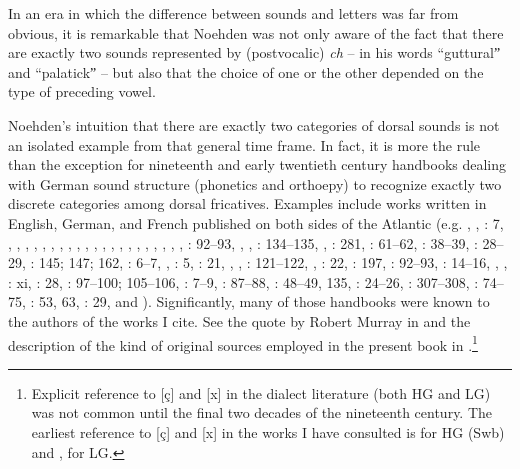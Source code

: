 In an era in which the difference between sounds and letters was far from obvious, it is remarkable that Noehden was not only aware of the fact that there are exactly two sounds represented by (postvocalic) \textit{ch} --  in his words “gutturalˮ and “palatickˮ -- but also that the choice of one or the other depended on the type of preceding vowel.

Noehden’s intuition that there are exactly two categories of dorsal sounds is not an isolated example from that general time frame. In fact, it is more the rule than the exception for nineteenth and early twentieth century handbooks dealing with German sound structure (phonetics and orthoepy) to recognize exactly two discrete categories among dorsal fricatives. Examples include works written in English, German, and French published on both sides of the Atlantic (e.g.
\citealt[7]{Render1804}, \citealt[166--167]{Bauer1827}, \citealt{Follen1828}: 7, \citealt[11]{Götzinger1830}, \citealt[7]{Bernays1833}, \citealt[199--200]{Götzinger1836}, \cites[69--70]{Rapp1836}[42--44]{Rapp1841}, \citealt[19]{Fosdick1838}, \citealt[28--29]{Gortzitza1841}, \citealt[2]{Wertheim1841}, \citealt[6, 48--50]{Schwabe1842}, \citealt[8]{Becker1845}, \citealt[3]{Adler1846}, \citealt[35]{Bauer1847}, \citealt[5]{Wendeborn1849},  \citealt[1]{Mannheimer1853}, \citealt[2]{Eichhorn1854}, \citealt[6]{Ahn1855}, \citealt[6]{Strauss1856}, \citealt[48]{Brücke1856}, \citealt[9--10]{Otto1864}, \citealt[12; 38--39]{Schmitt1868}, \citealt[16]{Humperdinck1868}, \citealt[23]{Worman1868}, \citealt{Rumpelt1869}: 92--93, \citealt[11]{Whitney1870}, \citealt[11]{Weisse1872}, \citealt{Sweet1877}: 134--135, \citealt[148--149]{Viëtor1884}, \citealt{Trautmann1884}: 281, \citealt{Sievers1885}: 61--62, \citealt{Hoffmann1888}: 38--39, \citealt{Schmolke1890}: 28--29, \citealt{Soames1891}: 145; 147; 162, \citealt{Grandgent1892}: 6--7, \citealt[76--77]{bremer1893}, \citealt{Wilmanns1893}: 5, \citealt{Valentine1894}: 21, \citealt[xxvi]{Siepmann1897}, \citealt[58--59]{Siebs1898}, \citealt{Hempl1898}: 121--122, \citealt[18]{Dannheisser1899}, \citealt{Viëtor1901}: 22, \citealt{Behaghel1902}: 197, \citealt{Trautmann1903}: 92--93,  \citealt{Johannson1906}: 14--16, \citealt[14, 16]{Viëtor1906}, \citealt[13]{Bacon1906}, \citealt{Schröer1907}: xi, \citealt{Sütterlin1907}: 28, \citealt{ScholleG.Smith1907}: 97--100; 105--106, \citealt{Grossmann1910}: 7--9, \citealt{Passy1912}: 87--88,  \citealt{Jespersen1913}: 48--49, 135, \citealt{Prokosch1916}: 24--26, \citealt{Paul1916}: 307--308, \citealt{Leky1917}: 74--75, \citealt{Richter1922}: 53, 63, \citealt{Curme1922}: 29, and \citealt[116--118]{Sütterlin1925}). Significantly, many of those handbooks were known to the authors of the works I cite. See the quote by Robert Murray in  and the description of the kind of original sources employed in the present book in .\footnote{Explicit reference to [ç] and [x] in the dialect literature (both HG and LG) was not common until the final two decades of the nineteenth century. The earliest reference to [ç] and [x] in the works I have consulted is \textcites[124--125]{Rapp1841}[]{Rapp1851} for HG (Swb) and \citet[302]{Rapp1840},  \citet[26]{Krüger1843} for LG.}

